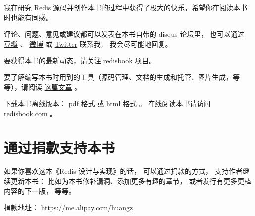 \documentclass[a4paper,11pt,english]{sphinxmanual}
\begin{document}
我在研究 Redis 源码并创作本书的过程中获得了极大的快乐，希望你在阅读本书时也能有同感。

评论、问题、意见或建议都可以发表在本书自带的 disqus 论坛里，
也可以通过 \href{http://www.douban.com/people/i\_m\_huangz/}{豆瓣} 、 \href{http://weibo.com/huangz1990}{微博} 或 \href{https://twitter.com/huangz1990}{Twitter} 联系我，
我会尽可能地回复。

要获得本书的最新动态，请关注 \href{https://github.com/huangz1990/redisbook}{redisbook} 项目。

要了解编写本书时用到的工具（源码管理、文档的生成和托管、图片生成，等等），请阅读 \href{http://www.huangz.me/en/latest/diary/2013/tools-for-writing-redisbook.html}{这篇文章} 。

下载本书离线版本： \href{https://github.com/huangz1990/redisbook/raw/master/pdf/redisbook.pdf}{pdf 格式} 或 \href{https://media.readthedocs.org/htmlzip/redisbook/latest/redisbook.zip}{html 格式} 。
在线阅读本书请访问 \href{http://www.redisbook.com/}{redisbook.com} 。


\chapter{通过捐款支持本书}
\label{index:id10}
如果你喜欢这本《Redis 设计与实现》的话，
可以通过捐款的方式，
支持作者继续更新本书：
比如为本书修补漏洞、添加更多有趣的章节，
或者发行有更多更棒内容的下一版，
等等。

捐款地址： \href{https://me.alipay.com/huangz}{https://me.alipay.com/huangz}



\renewcommand{\indexname}{Index}
\printindex
\end{document}
